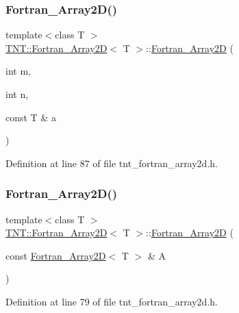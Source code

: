 \subsubsection{\texorpdfstring{Fortran\+\_\+\+Array2\+D()}{Fortran\_Array2D()}\hspace{0.1cm}{\footnotesize\ttfamily [4/5]}}
{\footnotesize\ttfamily template$<$class T $>$ \\
\hyperlink{classTNT_1_1Fortran__Array2D}{T\+N\+T\+::\+Fortran\+\_\+\+Array2D}$<$ T $>$\+::\hyperlink{classTNT_1_1Fortran__Array2D}{Fortran\+\_\+\+Array2D} (\begin{DoxyParamCaption}\item[{int}]{m,  }\item[{int}]{n,  }\item[{const T \&}]{a }\end{DoxyParamCaption})}



Definition at line 87 of file tnt\+\_\+fortran\+\_\+array2d.\+h.

\mbox{\label{classTNT_1_1Fortran__Array2D_ae4537235bf543fe4034f0e8e4ffbdfe7}} 
\subsubsection{\texorpdfstring{Fortran\+\_\+\+Array2\+D()}{Fortran\_Array2D()}\hspace{0.1cm}{\footnotesize\ttfamily [5/5]}}
{\footnotesize\ttfamily template$<$class T $>$ \\
\hyperlink{classTNT_1_1Fortran__Array2D}{T\+N\+T\+::\+Fortran\+\_\+\+Array2D}$<$ T $>$\+::\hyperlink{classTNT_1_1Fortran__Array2D}{Fortran\+\_\+\+Array2D} (\begin{DoxyParamCaption}\item[{const \hyperlink{classTNT_1_1Fortran__Array2D}{Fortran\+\_\+\+Array2D}$<$ T $>$ \&}]{A }\end{DoxyParamCaption})\hspace{0.3cm}{\ttfamily [inline]}}



Definition at line 79 of file tnt\+\_\+fortran\+\_\+array2d.\+h.

\mbox{\label{classTNT_1_1Fortran__Array2D_a8a687f53f3ceab1579d00d372402e9b0}} 
